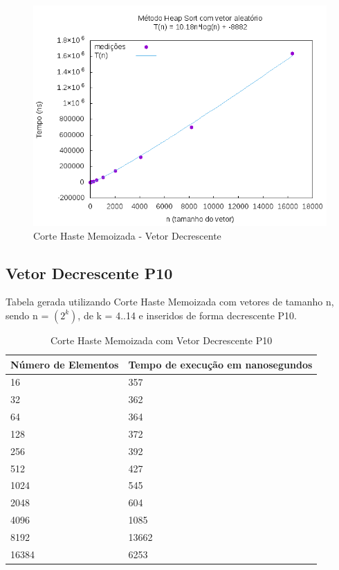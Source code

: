 \documentclass[12pt,a4paper,twoside]{report}
\begin{document}
\begin{figure}[H]
    \centering
    \includegraphics[width=0.7\linewidth]{graficos/HeapSort/vIntAleatorio/vIntAleatorio.png}
  \caption{Corte Haste Memoizada - Vetor Decrescente}
\end{figure}


\subsection{Vetor Decrescente P10}
Tabela gerada utilizando Corte Haste Memoizada com vetores de tamanho n, sendo n = $(2^k)$, de k = 4..14 e inseridos de forma decrescente P10.
\begin{table}[H]
\centering
\caption{Corte Haste Memoizada com Vetor Decrescente P10}
\label{my-label}
\begin{tabular}{|l|l|}
\hline
\multicolumn{1}{|c|}{\textbf{Número de Elementos}} & \multicolumn{1}{c|}{\textbf{Tempo de execução em nanosegundos}} \\ \hline
16 & 357 \\ \hline
32 & 362 \\ \hline
64 & 364 \\ \hline
128 & 372 \\ \hline
256 & 392 \\ \hline
512 & 427 \\ \hline
1024 & 545 \\ \hline
2048 & 604 \\ \hline
4096 & 1085 \\ \hline
8192 & 13662 \\ \hline
16384 & 6253 \\ \hline
\end{tabular}
\end{table}
\end{document}
